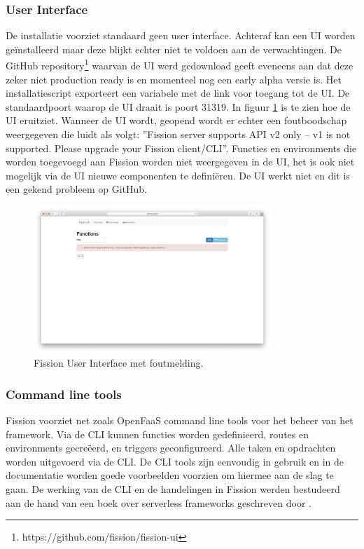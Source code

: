 \subsubsection{User Interface}
De installatie voorziet standaard geen user interface. Achteraf kan een UI worden geïnstalleerd maar deze blijkt echter niet te voldoen aan de verwachtingen. De GitHub repository\footnote{https://github.com/fission/fission-ui} waarvan de UI werd gedownload geeft eveneens aan dat deze zeker niet production ready is en momenteel nog een early alpha versie is. Het installatiescript exporteert een variabele met de link voor toegang tot de UI. De standaardpoort waarop de UI draait is poort 31319. In figuur \ref{fig:fission-ui} is te zien hoe de UI eruitziet. Wanneer de UI wordt, geopend wordt er echter een foutboodschap weergegeven die luidt als volgt: ''Fission server supports API v2 only -- v1 is not supported. Please upgrade your Fission client/CLI''. Functies en environments die worden toegevoegd aan Fission worden niet weergegeven in de UI, het is ook niet mogelijk via de UI nieuwe componenten te definiëren. De UI werkt niet en dit is een gekend probleem op GitHub.
\begin{figure}
    \centering
    \includegraphics[width=0.8\textwidth]{img/fission-ui.png}
    \caption{Fission User Interface met foutmelding.}
    \label{fig:fission-ui}  
\end{figure}

\subsubsection{Command line tools}
Fission voorziet net zoals OpenFaaS command line tools voor het beheer van het framework. Via de CLI kunnen functies worden gedefinieerd, routes en environments gecreëerd, en triggers geconfigureerd. Alle taken en opdrachten worden uitgevoerd via de CLI. De CLI tools zijn eenvoudig in gebruik en in de documentatie worden goede voorbeelden voorzien om hiermee aan de slag te gaan. De werking van de CLI en de handelingen in Fission werden bestudeerd aan de hand van een boek over serverless frameworks geschreven door \textcite{McKendrick2018}.

